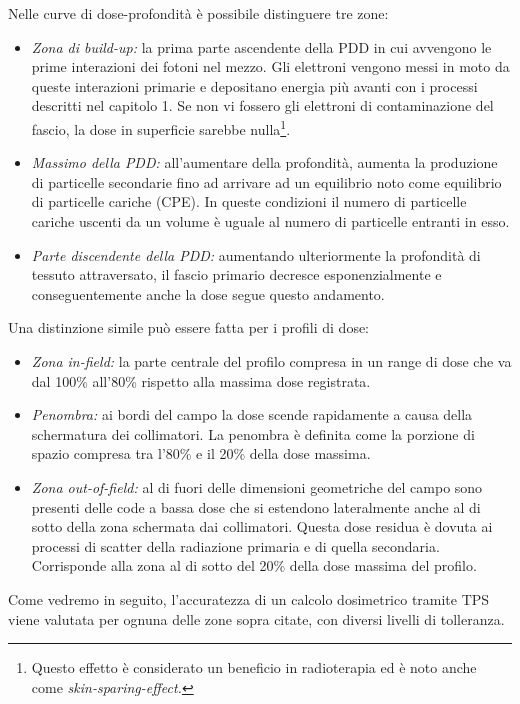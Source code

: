 Nelle curve di dose-profondità è possibile distinguere tre zone:
\begin{itemize}
\item \textit{Zona di build-up:} la prima parte ascendente della PDD in cui avvengono le prime interazioni dei fotoni nel mezzo. Gli elettroni vengono messi in moto da queste interazioni primarie e depositano energia più avanti con i processi descritti nel capitolo 1. Se non vi fossero gli elettroni di contaminazione del fascio, la dose in superficie sarebbe nulla\footnote{Questo effetto è considerato un beneficio in radioterapia ed è noto anche come \textit{skin-sparing-effect.}}.
\item \textit{Massimo della PDD:} all'aumentare della profondità, aumenta la produzione di particelle secondarie fino ad arrivare ad un equilibrio noto come equilibrio di particelle cariche (CPE). In queste condizioni il numero di particelle cariche uscenti da un volume è uguale al numero di particelle entranti in esso.
\item \textit{Parte discendente della PDD:} aumentando ulteriormente la profondità di tessuto attraversato, il fascio primario decresce esponenzialmente e conseguentemente anche la dose segue questo andamento.
\end{itemize}

Una distinzione simile può essere fatta per i profili di dose:
\begin{itemize}
\item \textit{Zona in-field:} la parte centrale del profilo compresa in un range di dose che va dal 100\% all'80\% rispetto alla massima dose registrata.
\item \textit{Penombra:} ai bordi del campo la dose scende rapidamente a causa della schermatura dei collimatori. La penombra è definita come la porzione di spazio compresa tra l'80\% e il 20\% della dose massima.
\item \textit{Zona out-of-field:} al di fuori delle dimensioni geometriche del campo sono presenti delle code a bassa dose che si estendono lateralmente anche al di sotto della zona schermata dai collimatori. Questa dose residua è dovuta ai processi di scatter della radiazione primaria e di quella secondaria. Corrisponde alla zona al di sotto del 20\% della dose massima del profilo.
\end{itemize}

Come vedremo in seguito, l'accuratezza di un calcolo dosimetrico tramite TPS viene valutata per ognuna delle zone sopra citate, con diversi livelli di tolleranza. 

